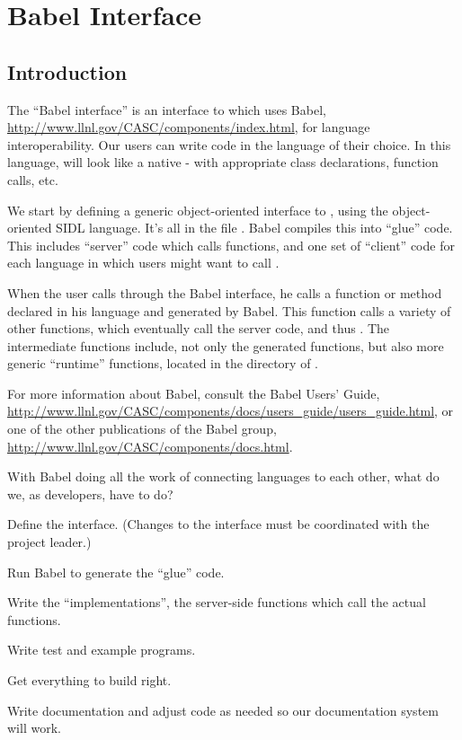 
\chapter{Babel Interface}
\label{ch-babel}

\section{Introduction}

The ``Babel interface'' is an interface to \hypre{} which uses Babel,
\url{http://www.llnl.gov/CASC/components/index.html}, for language
interoperability.  Our users can write code in the language of their
choice. In this language, \hypre{} will look like a native - with
appropriate class declarations, function calls, etc.

We start by defining a generic object-oriented interface to \hypre{},
using the object-oriented SIDL language.  It's all in the file
.  Babel compiles this into ``glue'' code.  This
includes ``server'' code which calls \hypre{} functions, and one set
of ``client'' code for each language in which users might want to
call \hypre{}.

When the user calls \hypre{} through the Babel interface, he calls a
function or method declared in his language and generated by Babel.
This function calls a variety of other functions, which eventually
call the server code, and thus \hypre{}.  The intermediate functions
include, not only the generated functions, but also more generic
``runtime'' functions, located in the  directory
of \hypre{}.

For more information about Babel, consult the Babel Users' Guide,
\url{http://www.llnl.gov/CASC/components/docs/users_guide/users_guide.html},
or one of the other publications of the Babel group,
\url{http://www.llnl.gov/CASC/components/docs.html}.


With Babel doing all the work of connecting languages to each other,
what do we, as \hypre{} developers, have to do?
\begin{list}{.}{\setlength{\itemsep}{0in}}
\item Define the \hypre{} interface.  (Changes to the interface must
be coordinated with the project leader.)
\item Run Babel to generate the ``glue'' code.
\item Write the ``implementations'', the server-side functions which
call the actual \hypre{} functions.
\item Write test and example programs.
\item Get everything to build right.
\item Write documentation and adjust code as needed so our
documentation system will work.
\end{list}

